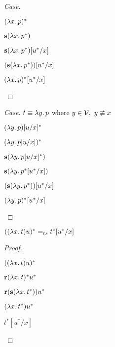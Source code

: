 \begin{prop}
\begin{proof}[Case]
\begin{itemize}
      \step[\equiv]
        $(\lambda x\ldotp p)^*$

      \step[\equiv]
        $\mathbf{s}(\lambda x\ldotp p^*)$
        \marginnote{\Def-$(-)^*$}

      \step[\equiv]
        $\mathbf{s}(\lambda x\ldotp p^*)[u^*/x]$

      \step[\equiv]
        $(\mathbf{s}(\lambda x\ldotp p^*))[u^*/x]$

      \step[\equiv]
        $(\lambda x\ldotp p)^*[u^*/x]$
        \marginnote{\Def-$(-)^*$}
        \qedhere
    \end{itemize}
  \end{proof}

  \begin{proof}[Case]
    $t\equiv\lambda y\ldotp p$ where $y\in\mathcal{V},~y\not\equiv x$
    \begin{itemize}
      \step
        $(\lambda y\ldotp p)[u/x]^*$

      \step[\equiv]
        $(\lambda y\ldotp p[u/x])^*$

      \step[\equiv]
        $\mathbf{s}(\lambda y\ldotp p[u/x]^*)$
        \marginnote{\Def-$(-)^*$}

      \step[\equiv]
        $\mathbf{s}(\lambda y\ldotp p^*[u^*/x])$

      \step[\equiv]
        $(\mathbf{s}(\lambda y\ldotp p^*))[u^*/x]$

      \step[\equiv]
        $(\lambda y\ldotp p)^*[u^*/x]$
        \marginnote{\Def-$(-)^*$}
        \qedhere
    \end{itemize}
  \end{proof}
\end{prop}

\begin{prop}
  $((\lambda x\ldotp t)u)^* =_{\text rs} t^*[u^*/x]$
  \begin{proof}~\\
    \begin{itemize}
      \step
        $((\lambda x\ldotp t)u)^*$

      \step[\equiv]
        $\mathbf{r}(\lambda x\ldotp t)^*u^*$
        \marginnote{\Def-$(-)^*$}

      \step[\equiv]
        $\mathbf{r}(\mathbf{s}(\lambda x\ldotp t^*))u^*$
        \marginnote{\Def-$(-)^*$}

      \step[=_{\text rs}]
        $(\lambda x\ldotp t^*)u^*$

      \step[=_\beta]
        $t^*[u^*/x]$
        \marginnote{\Def-$=_\beta$}
        \qedhere
    \end{itemize}
  \end{proof}
\end{prop}

